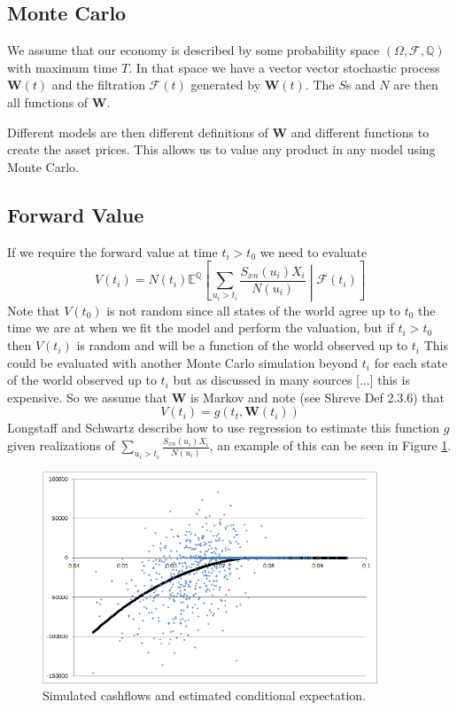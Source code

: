 \documentclass[a4paper,10pt]{article}
\newcommand{\E}{\mathbb{E}}                 %
\newcommand{\Q}{\mathbb{Q}}                 %
\begin{document}
\subsection{Monte Carlo}
We assume that our economy is described by some probability space $(\Omega, \mathcal{F}, \Q)$ with maximum time $T$.  In that space we have a vector vector stochastic process $\textbf{W}(t)$ and the filtration $\mathcal{F}(t)$ generated by $\textbf{W}(t)$.  The $S$s and $N$ are then all functions of $\textbf{W}$.

Different models are then different definitions of $\textbf{W}$ and different functions to create the asset prices.  
This allows us to value any product in any model using Monte Carlo.

\subsection{Forward Value}
If we require the forward value at time $t_i > t_0$ we need to evaluate
\begin{equation}
V(t_i) = N(t_i)\E^\Q\left[ \sum_{u_i>t_i}{\frac{S_{xn}(u_i)X_i}{N(u_i)}} \middle| \mathcal{F}(t_i) \right]
\label{eq:fwdvalue1}
\end{equation}
Note that $V(t_0)$ is not random since all states of the world agree up to $t_0$ the time we are at when we fit the model and perform the valuation, but if $t_i>t_0$ then $V(t_i)$ is random and will be a function of the world observed up to $t_i$
This could be evaluated with another Monte Carlo simulation beyond $t_i$ for each state of the world observed up to $t_i$ but as discussed in many sources [...] this is expensive.  So we assume that $\textbf{W}$ is Markov and note (see Shreve \cite{Shreve} Def 2.3.6) that 
\begin{equation}
V(t_i) = g(t_t, \textbf{W}(t_i))
\label{eq:regress}
\end{equation}
Longstaff and Schwartz \cite{Longstaff01valuingamerican} describe how to use regression to estimate this function $g$ given realizations of $\sum_{u_i>t_i}{\frac{S_{xn}(u_i)X_i}{N(u_i)}}$, an example of this can be seen in Figure \ref{fig:ConditionalExpectationEx1}.

\begin{figure}
	\centering
		\includegraphics[width=100mm]{ConditionalExpectationEx1.png}
	\caption{Simulated cashflows and estimated conditional expectation.}	
	\label{fig:ConditionalExpectationEx1}
\end{figure}
\end{document}
